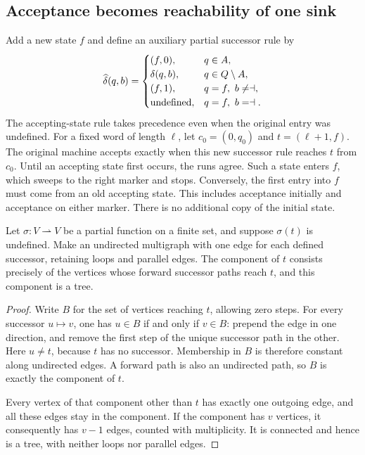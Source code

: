 \subsection{Acceptance becomes reachability of one sink}

Add a new state $f$ and define an auxiliary partial successor rule by
\begin{equation}\label{btc:mach:normalization}
 \widehat\delta(q,b)=
 \begin{cases}
 (f,0),&q\in A,\\
 \delta(q,b),&q\in Q\setminus A,\\
 (f,1),&q=f,\ b\ne\dashv,\\
 \text{undefined},&q=f,\ b=\dashv.
 \end{cases}
\end{equation}
The accepting-state rule takes precedence even when the original entry
was undefined. For a fixed word of length $\ell$, let
$c_0=(0,q_0)$ and $t=(\ell+1,f)$. The original machine accepts exactly
when this new successor rule reaches $t$ from $c_0$. Until an accepting
state first occurs, the runs agree. Such a state enters $f$, which sweeps
to the right marker and stops. Conversely, the first entry into $f$
must come from an old accepting state. This includes acceptance initially
and acceptance on either marker. There is no additional copy of the
initial state.

\begin{lemma}\label{btc:mach:tree}
Let $\sigma:V\rightharpoonup V$ be a partial function on a finite set,
and suppose $\sigma(t)$ is undefined. Make an undirected multigraph with
one edge for each defined successor, retaining loops and parallel edges.
The component of $t$ consists precisely of the vertices whose forward
successor paths reach $t$, and this component is a tree.
\end{lemma}

\begin{proof}
Write $B$ for the set of vertices reaching $t$, allowing zero steps.
For every successor $u\mapsto v$, one has $u\in B$ if and only if
$v\in B$: prepend the edge in one direction, and remove the first
step of the unique successor path in the other. Here $u\ne t$, because
$t$ has no successor. Membership in $B$ is therefore constant along
undirected edges. A forward path is also an undirected path, so $B$ is
exactly the component of $t$.

Every vertex of that component other than $t$ has exactly one outgoing
edge, and all these edges stay in the component. If the component has
$v$ vertices, it consequently has $v-1$ edges, counted with multiplicity.
It is connected and hence is a tree, with neither loops nor parallel
edges.
\end{proof}

